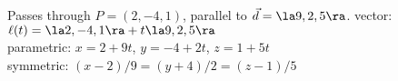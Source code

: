{Passes through $P=(2,-4,1)$, parallel to $\vec d=\la 9,2,5\ra$.
}
{vector: $\ell(t) = \la 2,-4,1\ra + t\la 9,2,5\ra$\\
parametric: $x= 2+9t$, $y=-4+2t$, $z = 1+5t$\\
symmetric: $(x-2)/9 =(y+4)/2 = (z-1)/5$
}

